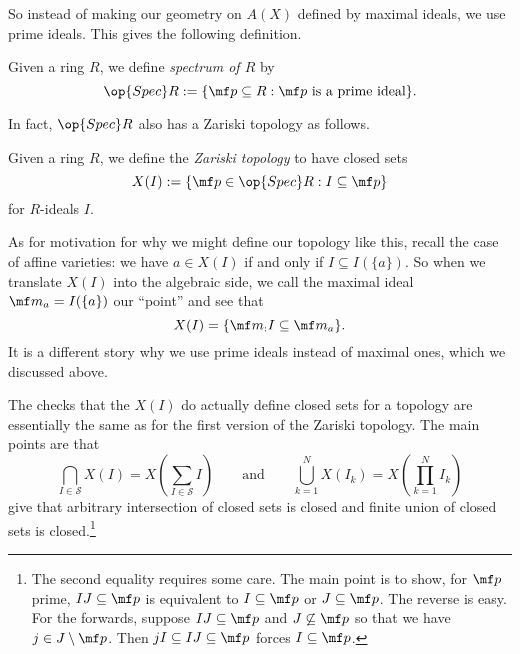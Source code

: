 So instead of making our geometry on $A(X)$ defined by maximal ideals, we use prime ideals. This gives the following definition.
\begin{definition}
	Given a ring $R$, we define \textit{spectrum of $R$} by
	\[\op{Spec}R:=\{\mf p\subseteq R:\mf p\text{ is a prime ideal}\}.\]
\end{definition}
In fact, $\op{Spec}R$ also has a Zariski topology as follows.
\begin{definition}
	Given a ring $R$, we define the \textit{Zariski topology} to have closed sets
	\[X(I):=\{\mf p\in\op{Spec}R:I\subseteq\mf p\}\]
	for $R$-ideals $I$.
\end{definition}
\begin{remark}[Nir]
	As for motivation for why we might define our topology like this, recall the case of affine varieties: we have $a\in X(I)$ if and only if $I\subseteq I(\{a\})$. So when we translate $X(I)$ into the algebraic side, we call the maximal ideal $\mf m_a=I(\{a\})$ our ``point'' and see that
	\[X(I)=\{\mf m_:I\subseteq\mf m_a\}.\]
	It is a different story why we use prime ideals instead of maximal ones, which we discussed above.
\end{remark}
The checks that the $X(I)$ do actually define closed sets for a topology are essentially the same as for the first version of the Zariski topology. The main points are that
\[\bigcap_{I\in\mathcal S}X(I)=X\left(\sum_{I\in\mathcal S}I\right)\qquad\text{and}\qquad\bigcup_{k=1}^NX(I_k)=X\left(\prod_{k=1}^NI_k\right)\]
give that arbitrary intersection of closed sets is closed and finite union of closed sets is closed.\footnote{The second equality requires some care. The main point is to show, for $\mf p$ prime, $IJ\subseteq\mf p$ is equivalent to $I\subseteq\mf p$ or $J\subseteq\mf p$. The reverse is easy. For the forwards, suppose $IJ\subseteq\mf p$ and $J\not\subseteq\mf p$ so that we have $j\in J\setminus\mf p$. Then $jI\subseteq IJ\subseteq\mf p$ forces $I\subseteq\mf p$.}

